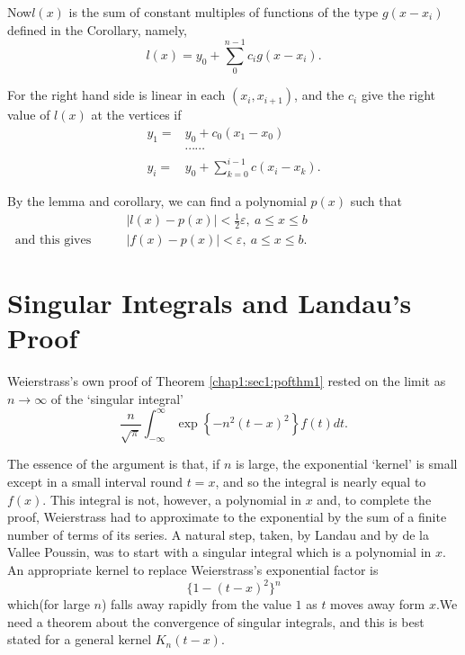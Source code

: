 Now\pageoriginale $l(x)$ is the sum of constant multiples of functions of the
type $ g (x -x_i) $ defined in the Corollary, namely,  
$$
l (x) = y_0 + \sum^{n-1}_{0} c_i g (x - x_i). 
$$

For the right hand side is linear in each  $(x_i, x_{i+1}) $, and
the $c_i$ give the right  value of $l (x)$ at the vertices if  
\begin{align*}
  y_1 = & y_0 + c_0 (x_1 - x_0)\\
  & \cdots \cdots \\
  y_i =  & y_0 + \sum^{i-1}_{k=0} c (x_i - x_k).
\end{align*}

By the lemma and corollary, we can find a polynomial $ p (x) $ such that 
$
  \begin{aligned}
  & | l (x) - p (x) | < \frac{1}{2} \varepsilon, ~ a \leq x \leq b \\  
  ~\text{and this gives} \qquad  
  &| f(x) - p(x) | <  \varepsilon, ~ a \leq x \leq b.
  \end{aligned}
$

\section{Singular Integrals and Landau's Proof}\label{chap1:sec2}

 Weierstrass's  own proof of Theorem \ref{chap1:sec1:pofthm1} rested on the limit as  $ n
 \to \infty $  of the `singular integral'   
 $$
 \frac{n}{\surd \pi} \int^{\infty}_{-\infty} \exp \left\{-n^2 (t -x
)^2 \right\} f (t) dt.  
 $$
 
The essence of the argument is that, if $n$  is large, the exponential
`kernel' is small except in a small interval round $ t = x $, and so
the integral is nearly equal to  $ f (x) $.  This integral is not,
however, a  polynomial in $x$ and, to complete the proof, Weierstrass
had to approximate  to the exponential by the sum of a finite number
of terms of its series. A natural  step, taken, by Landau and by de la
Vallee Poussin, was to start with a singular integral which  is a
polynomial in $x$. An appropriate kernel to replace Weierstrass's
exponential factor is  
$$
\big \{1 - (t-x)^2 \big \}^n
$$ 
which\pageoriginale (for large $n$)  falls away rapidly from the value $1$  as $t$
moves away form $x$.We need a theorem about the convergence of
singular integrals, and this is best stated for a general kernel $ K_n
(t -x) $.  

